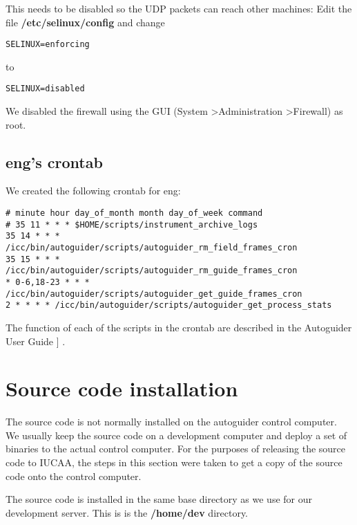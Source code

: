 \documentclass[10pt,a4paper]{article}
\begin{document}
This needs to be disabled so the UDP packets can reach other machines:
Edit the file {\bf /etc/selinux/config} and change

\begin{verbatim}
SELINUX=enforcing
\end{verbatim}

to

\begin{verbatim}
SELINUX=disabled
\end{verbatim}

We disabled the firewall using the GUI (System \textgreater Administration \textgreater Firewall) as root.

\subsection{eng's crontab}

We created the following crontab for eng:
\begin{verbatim}
# minute hour day_of_month month day_of_week command
# 35 11 * * * $HOME/scripts/instrument_archive_logs
35 14 * * * /icc/bin/autoguider/scripts/autoguider_rm_field_frames_cron
35 15 * * * /icc/bin/autoguider/scripts/autoguider_rm_guide_frames_cron
* 0-6,18-23 * * * /icc/bin/autoguider/scripts/autoguider_get_guide_frames_cron
2 * * * * /icc/bin/autoguider/scripts/autoguider_get_process_stats
\end{verbatim}

The function of each of the scripts in the crontab are described in the Autoguider User Guide ]
\cite{bib:autoguideruserguide}.

\section{Source code installation}

The source code is not normally installed on the autoguider control computer. We usually keep the source code on a development computer and deploy a set of binaries to the actual control computer. For the purposes of releasing the source code to IUCAA, the steps in this section were taken to get a copy of the source code onto the control computer.

The source code is installed in the same base directory as we use for our development server. This is is the {\bf /home/dev} directory.
\end{document}
